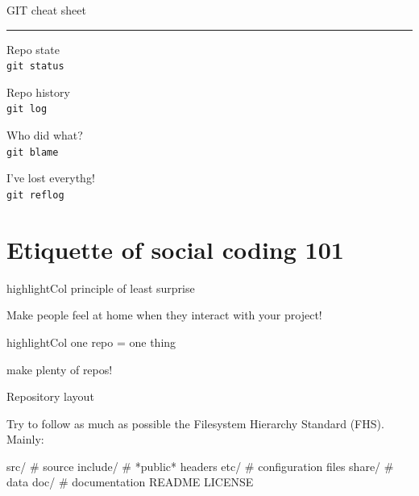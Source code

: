 \documentclass[compress]{beamer}
\newcommand{\highlight}[1]{%
    \vspace{1em}%
    \begin{beamercolorbox}[wd=\linewidth,ht=2ex,dp=0.7ex]{highlightCol}%
    \centering #1%
    \end{beamercolorbox}%
    \vspace{1em}%
}%
\begin{document}
\begin{frame}{GIT cheat sheet}
\begin{multicols}{2}
    \rule{\columnwidth}{0.2pt}

    \begin{multicols}{2}
    {\Medium Repo state}\\
    \texttt{git status}\par

    {\Medium Repo history}\\
    \texttt{git log}\par

    {\Medium Who did what?}\\
    \texttt{git blame}\par

    {\Medium I've lost everythg!}\\
    \texttt{git reflog}\par


    \end{multicols}


    \end{multicols}

\end{frame}

\section{Etiquette of social coding 101}

\begin{frame}{}
    \centering

    \highlight{\Medium principle of least surprise}

    Make people feel at home when they interact with your project!

\end{frame}

\begin{frame}{}
    \centering
    \highlight{one repo = one thing}

    make plenty of repos!
\end{frame}

\begin{frame}[fragile]{Repository layout}

Try to follow as much as possible the {\Medium Filesystem Hierarchy
 Standard} (FHS). Mainly:

\begin{shcode}
src/        # source
include/    # *public* headers
etc/        # configuration files
share/      # data
doc/        # documentation
README
LICENSE
\end{shcode}

\centering


\end{frame}
\end{document}
